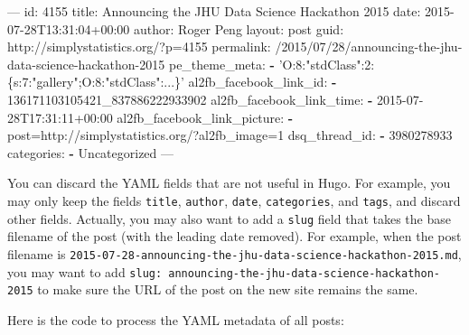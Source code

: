 \documentclass[12pt,]{krantz}
\makeatletter
\newenvironment{Shaded}{\begin{snugshade}}{\end{snugshade}}
\newcommand{\AttributeTok}[1]{\textcolor[rgb]{0.77,0.63,0.00}{#1}}
\newcommand{\FunctionTok}[1]{\textcolor[rgb]{0.00,0.00,0.00}{#1}}
\newcommand{\KeywordTok}[1]{\textcolor[rgb]{0.13,0.29,0.53}{\textbf{#1}}}
\newcommand{\NormalTok}[1]{#1}
\newcommand{\OtherTok}[1]{\textcolor[rgb]{0.56,0.35,0.01}{#1}}
\newcommand{\StringTok}[1]{\textcolor[rgb]{0.31,0.60,0.02}{#1}}
\newenvironment{kframe}{%
\medskip{}
\setlength{\fboxsep}{.8em}
 \def\at@end@of@kframe{}%
 \ifinner\ifhmode%
  \def\at@end@of@kframe{\end{minipage}}%
  \begin{minipage}{\columnwidth}%
 \fi\fi%
 \def\FrameCommand##1{\hskip\@totalleftmargin \hskip-\fboxsep
 \colorbox{shadecolor}{##1}\hskip-\fboxsep
     \hskip-\linewidth \hskip-\@totalleftmargin \hskip\columnwidth}%
 \MakeFramed {\advance\hsize-\width
   \@totalleftmargin\z@ \linewidth\hsize
   \@setminipage}}%
 {\par\unskip\endMakeFramed%
 \at@end@of@kframe}
\renewenvironment{Shaded}{\begin{kframe}}{\end{kframe}}
\theoremstyle{definition}
\theoremstyle{definition}
\theoremstyle{definition}
\theoremstyle{remark}
\makeatother
\begin{document}
\begin{Shaded}
\begin{Highlighting}[]
\OtherTok{---}
\FunctionTok{id:}\AttributeTok{ 4155}
\FunctionTok{title:}\AttributeTok{ Announcing the JHU Data Science Hackathon 2015}
\FunctionTok{date:}\AttributeTok{ 2015-07-28T13:31:04+00:00}
\FunctionTok{author:}\AttributeTok{ Roger Peng}
\FunctionTok{layout:}\AttributeTok{ post}
\FunctionTok{guid:}\AttributeTok{ http://simplystatistics.org/?p=4155}
\FunctionTok{permalink:}\AttributeTok{ /2015/07/28/announcing-the-jhu-data-science-hackathon-2015}
\FunctionTok{pe_theme_meta:}
  \KeywordTok{-} \StringTok{'O:8:"stdClass":2:\{s:7:"gallery";O:8:"stdClass":...\}'}
\FunctionTok{al2fb_facebook_link_id:}
  \KeywordTok{-}\NormalTok{ 136171103105421_837886222933902}
\FunctionTok{al2fb_facebook_link_time:}
  \KeywordTok{-} \FunctionTok{2015-07-28T17:}\AttributeTok{31:11+00:00}
\FunctionTok{al2fb_facebook_link_picture:}
  \KeywordTok{-} \FunctionTok{post=http:}\AttributeTok{//simplystatistics.org/?al2fb_image=1}
\FunctionTok{dsq_thread_id:}
  \KeywordTok{-}\NormalTok{ 3980278933}
\FunctionTok{categories:}
  \KeywordTok{-}\NormalTok{ Uncategorized}
\OtherTok{---}
\end{Highlighting}
\end{Shaded}

You can discard the YAML fields that are not useful in Hugo. For
example, you may only keep the fields \texttt{title}, \texttt{author},
\texttt{date}, \texttt{categories}, and \texttt{tags}, and discard other
fields. Actually, you may also want to add a \texttt{slug} field that
takes the base filename of the post (with the leading date removed). For
example, when the post filename is
\texttt{2015-07-28-announcing-the-jhu-data-science-hackathon-2015.md},
you may want to add
\texttt{slug:\ announcing-the-jhu-data-science-hackathon-2015} to make
sure the URL of the post on the new site remains the same.

Here is the code to process the YAML metadata of all posts:
\end{document}
